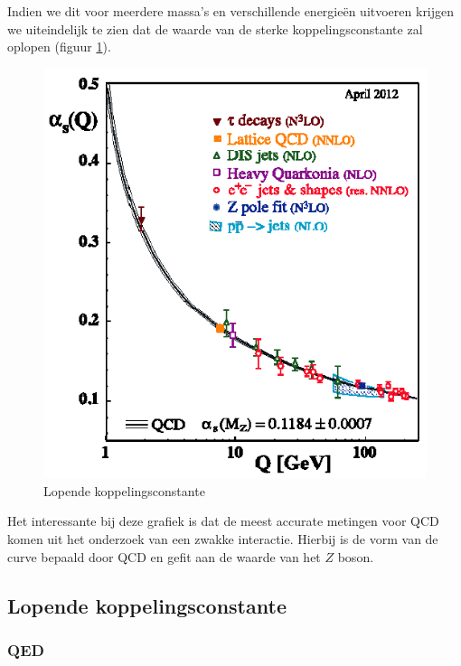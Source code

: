 \documentclass[../main.tex]{subfiles}
\begin{document}
Indien we dit voor meerdere massa's en verschillende energieën uitvoeren krijgen we uiteindelijk te zien dat de waarde van de sterke koppelingsconstante zal oplopen (figuur \ref{fig:running_str_kop}).

\begin{figure}[h]
    \centering
    \includegraphics[width=0.6\linewidth]{QCD/running_str_kop.png}
    \caption{Lopende koppelingsconstante}%
    \label{fig:running_str_kop}
\end{figure}

Het interessante bij deze grafiek is dat de meest accurate metingen voor QCD komen uit het onderzoek van een zwakke interactie. Hierbij is de vorm van de curve bepaald door QCD en gefit aan de waarde van het $Z$ boson.

\subsection{Lopende koppelingsconstante}%
\label{sub:lopende_koppelingsconstante}

\subsubsection{QED}%
\label{ssub:qed}
\end{document}
